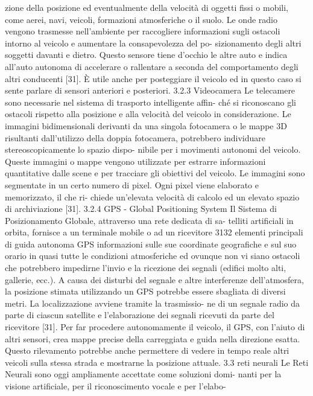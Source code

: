 \documentclass[14pt]{extarticle}
\begin{document}
\begin{itemize}
zione della posizione ed eventualmente della velocità di oggetti fissi o
mobili, come aerei, navi, veicoli, formazioni atmosferiche o il suolo. Le
onde radio vengono trasmesse nell’ambiente per raccogliere informazioni
sugli ostacoli intorno al veicolo e aumentare la consapevolezza del po-
sizionamento degli altri soggetti davanti e dietro. Questo sensore tiene
d’occhio le altre auto e indica all’auto autonoma di accelerare o rallentare
a seconda del comportamento degli altri conducenti [31].
È utile anche per posteggiare il veicolo ed in questo caso si sente parlare
di sensori anteriori e posteriori.
3.2.3
Videocamera
Le telecamere sono necessarie nel sistema di trasporto intelligente affin-
ché si riconoscano gli ostacoli rispetto alla posizione e alla velocità del
veicolo in considerazione. Le immagini bidimensionali derivanti da una
singola fotocamera o le mappe 3D risultanti dall’utilizzo della doppia
fotocamera, potrebbero individuare stereoscopicamente lo spazio dispo-
nibile per i movimenti autonomi del veicolo. Queste immagini o mappe
vengono utilizzate per estrarre informazioni quantitative dalle scene e
per tracciare gli obiettivi del veicolo. Le immagini sono segmentate in un
certo numero di pixel. Ogni pixel viene elaborato e memorizzato, il che ri-
chiede un’elevata velocità di calcolo ed un elevato spazio di archiviazione
[31].
3.2.4
GPS - Global Positioning System
Il Sistema di Posizionamento Globale, attraverso una rete dedicata di sa-
telliti artificiali in orbita, fornisce a un terminale mobile o ad un ricevitore
3132
elementi principali di guida autonoma
GPS informazioni sulle sue coordinate geografiche e sul suo orario in
quasi tutte le condizioni atmosferiche ed ovunque non vi siano ostacoli
che potrebbero impedirne l’invio e la ricezione dei segnali (edifici molto
alti, gallerie, ecc.). A causa dei disturbi del segnale e altre interferenze
dell’atmosfera, la posizione stimata utilizzando un GPS potrebbe essere
sbagliata di diversi metri. La localizzazione avviene tramite la trasmissio-
ne di un segnale radio da parte di ciascun satellite e l’elaborazione dei
segnali ricevuti da parte del ricevitore [31].
Per far procedere autonomamente il veicolo, il GPS, con l’aiuto di altri
sensori, crea mappe precise della carreggiata e guida nella direzione
esatta. Questo rilevamento potrebbe anche permettere di vedere in tempo
reale altri veicoli sulla stessa strada e mostrarne la posizione attuale.
3.3
reti neurali
Le Reti Neurali sono oggi ampliamente accettate come soluzioni domi-
nanti per la visione artificiale, per il riconoscimento vocale e per l’elabo-

\end{itemize}
\end{document}
